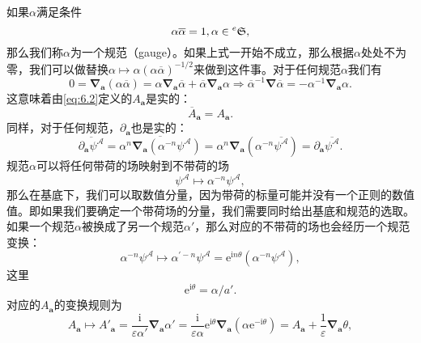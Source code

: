 如果$\alpha $满足条件
\begin{equation*}
	\alpha \overline{\alpha } =1,\alpha \in \prescript{e}{}{}\mathfrak{S} ,
\end{equation*}
那么我们称$\alpha $为一个规范（gauge）。如果上式一开始不成立，那么根据$\alpha $处处不为零，我们可以做替换$\alpha \mapsto \alpha ( \alpha \overline{\alpha })^{-1/2}$来做到这件事。对于任何规范$\alpha $我们有
\begin{equation*}
	0=\boldsymbol{\nabla }_{\boldsymbol{a}}( \alpha \overline{\alpha }) =\alpha \boldsymbol{\nabla }_{\boldsymbol{a}}\overline{\alpha } +\overline{\alpha }\boldsymbol{\nabla }_{\boldsymbol{a}} \alpha \Rightarrow \overline{\alpha }^{-1}\boldsymbol{\nabla }\overline{\alpha } =-\alpha ^{-1}\boldsymbol{\nabla }_{\boldsymbol{a}} \alpha .
\end{equation*}
这意味着由\ref{eq:6.2}定义的$A_{\boldsymbol{a}}$是实的：
\begin{equation*}
	\overline{A}_{\boldsymbol{a}} =A_{\boldsymbol{a}} .
\end{equation*}
同样，对于任何规范，$\partial _{\boldsymbol{a}}$也是实的：
\begin{equation*}
	\overline{\partial _{\boldsymbol{a}} \psi ^{\mathcal{A}}} =\overline{\alpha ^{n}\boldsymbol{\nabla }_{\boldsymbol{a}} (\alpha ^{-n} \psi ^{\mathcal{A}} )} =\alpha ^{n}\boldsymbol{\nabla }_{\boldsymbol{a}} (\alpha ^{-n}\overline{\psi ^{\mathcal{A}}} )=\partial _{\boldsymbol{a}}\overline{\psi ^{\mathcal{A}}} .
\end{equation*}
规范$\alpha $可以将任何带荷的场映射到不带荷的场
\begin{equation*}
	\psi ^{\mathcal{A}} \mapsto \alpha ^{-n} \psi ^{\mathcal{A}} ,
\end{equation*}
那么在基底下，我们可以取数值分量，因为带荷的标量可能并没有一个正则的数值值。即如果我们要确定一个带荷场的分量，我们需要同时给出基底和规范的选取。如果一个规范$\alpha $被换成了另一个规范$\alpha '$，那么对应的不带荷的场也会经历一个规范变换：
\begin{equation*}
	\alpha ^{-n} \psi ^{\mathcal{A}} \mapsto \alpha ^{\prime -n} \psi ^{\mathcal{A}} =\mathrm{e}^{\mathrm{i} n\theta } (\alpha ^{-n} \psi ^{\mathcal{A}} ),
\end{equation*}
这里
\begin{equation*}
	\mathrm{e}^{\mathrm{i} \theta } =\alpha /a'.
\end{equation*}
对应的$A_{\boldsymbol{a}}$的变换规则为
\begin{equation}
	A_{\boldsymbol{a}} \mapsto A'_{\boldsymbol{a}} =\frac{\mathrm{i}}{\varepsilon \alpha '}\boldsymbol{\nabla }_{\boldsymbol{a}} \alpha '=\frac{\mathrm{i}}{\varepsilon \alpha }\mathrm{e}^{\mathrm{i} \theta }\boldsymbol{\nabla }_{\boldsymbol{a}} (\alpha \mathrm{e}^{-\mathrm{i} \theta } )=A_{\boldsymbol{a}} +\frac{1}{\varepsilon }\boldsymbol{\nabla }_{\boldsymbol{a}} \theta ,
	\label{eq:6.3}
\end{equation}
